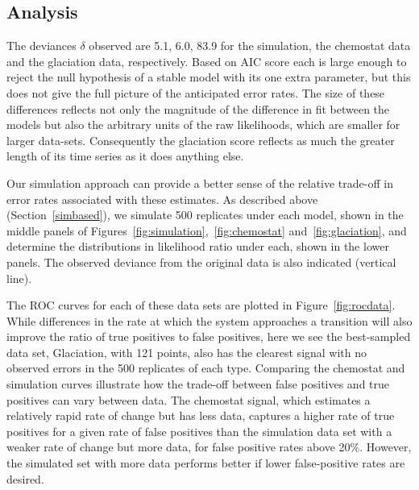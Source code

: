 \documentclass[authoryear,review,11pt]{elsarticle}
\begin{document}
\subsection*{Analysis}
The deviances $\delta$ observed are 5.1, 6.0, 83.9 for the simulation,
the chemostat data and the glaciation data, respectively.
Based on AIC score each is large enough to reject the null hypothesis of a stable model 
with its one extra parameter, but this does not give the full picture of the anticipated error rates.  
The size of these differences reflects not only the magnitude of the difference in fit
between the models but also the arbitrary units of the raw likelihoods,
which are smaller for larger data-sets.
Consequently the glaciation score reflects as much the greater length of its time series as it does anything else.
 

Our simulation approach can provide a better sense of the relative trade-off in error rates associated
with these estimates.  
As described above (Section~\ref{simbased}), we simulate 500 replicates under each model, 
shown in the middle panels of Figures~\ref{fig:simulation},~\ref{fig:chemostat} and~\ref{fig:glaciation},
and determine the distributions in likelihood ratio under each, shown in the lower panels.  
The observed deviance from the original data is also indicated (vertical line).

The ROC curves for each of these data sets are plotted in Figure~\ref{fig:rocdata}.  
While differences in the rate at which the system approaches a transition will also 
improve the ratio of true positives to false positives, 
here we see the best-sampled data set, Glaciation, with 121 points, 
also has the clearest signal with no observed errors in the 500 replicates of each type.   
Comparing the chemostat and simulation curves illustrate how the trade-off between
false positives and true positives can vary between data.  The chemostat signal, 
which estimates a relatively rapid rate of change but has less data, captures a higher
rate of true positives for a given rate of false positives than the simulation data
set with a weaker rate of change but more data, for false positive rates above 20\%.  
However, the simulated set with more data performs better if lower false-positive rates
are desired.  


\end{document}
